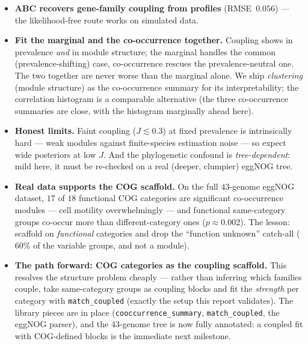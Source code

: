 \documentclass[11pt]{article}
\begin{document}
\begin{itemize}\setlength\itemsep{0.15em}
\item \textbf{ABC recovers gene-family coupling from profiles} (RMSE~$0.056$) --- the
likelihood-free route works on simulated data.
\item \textbf{Fit the marginal and the co-occurrence together.} Coupling shows in prevalence
\emph{and} in module structure; the marginal handles the common (prevalence-shifting) case,
co-occurrence rescues the prevalence-neutral one. The two together are never worse than the
marginal alone. We ship \emph{clustering} (module structure) as the co-occurrence summary for its
interpretability; the correlation histogram is a comparable alternative (the three co-occurrence
summaries are close, with the histogram marginally ahead here).
\item \textbf{Honest limits.} Faint coupling ($J\!\lesssim\!0.3$) at fixed prevalence is
intrinsically hard --- weak modules against finite-species estimation noise --- so expect wide
posteriors at low $J$. And the phylogenetic confound is \emph{tree-dependent}: mild here, it must
be re-checked on a real (deeper, clumpier) eggNOG tree.
\item \textbf{Real data supports the COG scaffold.} On the full $43$-genome eggNOG dataset,
$17$ of $18$ functional COG categories are significant co-occurrence modules --- cell motility
overwhelmingly --- and functional same-category groups co-occur more than different-category ones
($p\approx0.002$). The lesson: scaffold on \emph{functional} categories and drop the
``function unknown'' catch-all ($60\%$ of the variable groups, and not a module).
\item \textbf{The path forward: COG categories as the coupling scaffold.} This resolves the
structure problem cheaply --- rather than inferring which families couple, take same-category
groups as coupling blocks and fit the \emph{strength} per category with \texttt{match\_coupled}
(exactly the setup this report validates). The library pieces are in place
(\texttt{cooccurrence\_summary}, \texttt{match\_coupled}, the eggNOG parser), and the $43$-genome
tree is now fully annotated: a coupled fit with COG-defined blocks is the immediate next milestone.
\end{itemize}
\end{document}
